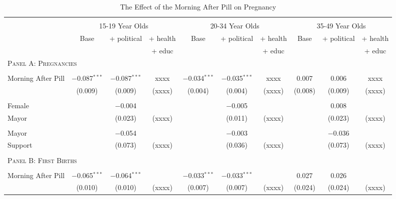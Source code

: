 

\begin{landscape}
\begin{table}[!htbp] \centering 
  \caption{The Effect of the Morning After Pill on Pregnancy} 
  \label{TEENtab:PillPreg} 
\begin{tabular}{@{\extracolsep{5pt}}lccccccccc} 
\\[-1.8ex]\hline 
\hline \\[-1.8ex] 
 & \multicolumn{3}{c}{15-19 Year Olds} & \multicolumn{3}{c}{20-34 Year Olds} & \multicolumn{3}{c}{35-49 Year Olds} \\ \cmidrule(r){2-4} \cmidrule(r){5-7} \cmidrule(r){8-10}
& Base & + political & + health & Base & + political & + health & Base & + political & + health \\ 
&  &  & + educ &  & & + educ &  &  & + educ \\
\midrule
\multicolumn{10}{l}{\textsc{\noindent Panel A: Pregnancies}} \\
& & & & & & & & & \\
 Morning After Pill  & $-$0.087$^{***}$ & $-$0.087$^{***}$ & xxxx &  $-$0.034$^{***}$ & $-$0.035$^{***}$  & xxxx &  0.007 & 0.006 & xxxx \\ 
  & (0.009) & (0.009) & (xxxx)  & (0.004) & (0.004) & (xxxx) & (0.008) & (0.009) & (xxxx) \\ 
  & & & & & & & & & \\ 
 Female &  &  $-$0.004 & &  &  $-$0.005 & &  &   0.008 & \\ 
 Mayor  &  &  (0.023) & (xxxx) &  &  (0.011) & (xxxx) &  &   (0.023) & (xxxx) \\ 
  & & & & & & & & & \\ 
 Mayor &  &  $-$0.054 & &  &   $-$0.003 & &  &   $-$0.036 & \\ 
 Support  &   & (0.073) & (xxxx) &  &  (0.036) & (xxxx) &  &   (0.073) & (xxxx) \\ 
  & & & & & & & & & \\ 
\multicolumn{10}{l}{\textsc{\noindent Panel B: First Births}} \\
& & & & & & & & & \\
 Morning After Pill & $-$0.065$^{***}$ & $-$0.064$^{***}$ & &  $-$0.033$^{***}$ & $-$0.033$^{***}$ &  & 0.027 & 0.026 & \\ 
  & (0.010) & (0.010) & (xxxx) & (0.007) & (0.007)  & (xxxx) & (0.024) & (0.024) & (xxxx) \\ 

\end{tabular}
\end{table}
\end{landscape}
